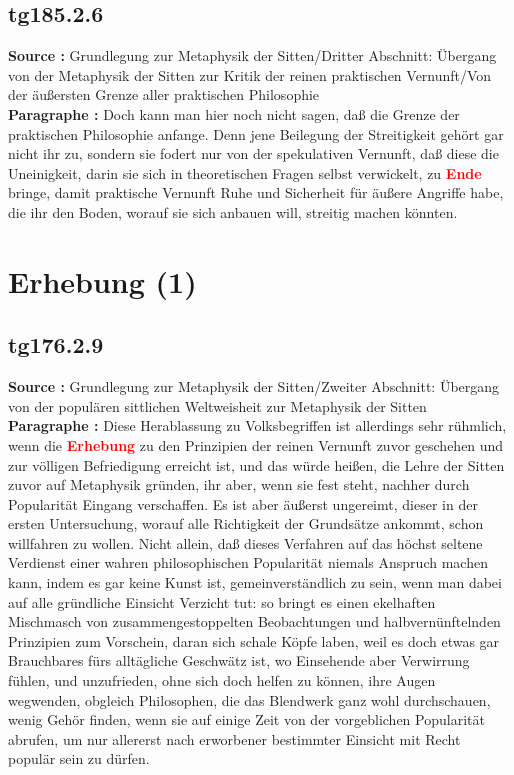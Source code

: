 \documentclass[a4paper,12pt,twoside]{book}
\newcommand{\match}[1]{\textcolor{red}{\textbf{#1}}}
\newcommand{\unnumberedsection}[1]{
	\section*{#1}
	\addcontentsline{toc}{section}{#1}
	\markright{#1}
}
\begin{document}
	\subsection*{tg185.2.6} 
	\textbf{Source : }Grundlegung zur Metaphysik der Sitten/Dritter Abschnitt: Übergang von der Metaphysik der Sitten zur Kritik der reinen praktischen Vernunft/Von der äußersten Grenze aller praktischen Philosophie\\  
	
	\noindent\textbf{Paragraphe : }Doch kann man hier noch nicht sagen, daß die Grenze der praktischen Philosophie anfange. Denn jene Beilegung der Streitigkeit gehört gar nicht ihr zu, sondern sie fodert nur von der spekulativen Vernunft, daß diese die Uneinigkeit, darin sie sich in theoretischen Fragen selbst verwickelt, zu \match{Ende} bringe, damit praktische Vernunft Ruhe und Sicherheit für äußere Angriffe habe, die ihr den Boden, worauf sie sich anbauen will, streitig machen könnten. 
	
	\unnumberedsection{Erhebung (1)} 
	\subsection*{tg176.2.9} 
	\textbf{Source : }Grundlegung zur Metaphysik der Sitten/Zweiter Abschnitt: Übergang von der populären sittlichen Weltweisheit zur Metaphysik der Sitten\\  
	
	\noindent\textbf{Paragraphe : }Diese Herablassung zu Volksbegriffen ist allerdings sehr rühmlich, wenn die \match{Erhebung} zu den Prinzipien der reinen Vernunft zuvor geschehen und zur völligen Befriedigung erreicht ist, und das würde heißen, die Lehre der Sitten zuvor auf Metaphysik gründen, ihr aber, wenn sie fest steht, nachher durch Popularität Eingang verschaffen. Es ist aber äußerst ungereimt, dieser in der ersten Untersuchung, worauf alle Richtigkeit der Grundsätze ankommt, schon willfahren zu wollen. Nicht allein, daß dieses Verfahren auf das höchst seltene Verdienst einer wahren philosophischen Popularität niemals Anspruch machen kann, indem es gar keine Kunst ist, gemeinverständlich zu sein, wenn man dabei auf alle gründliche Einsicht Verzicht tut: so bringt es einen ekelhaften Mischmasch von zusammengestoppelten Beobachtungen und halbvernünftelnden Prinzipien zum Vorschein, daran sich schale Köpfe laben, weil es doch etwas gar Brauchbares fürs alltägliche Geschwätz ist, wo Einsehende aber Verwirrung fühlen, und unzufrieden, ohne sich doch helfen zu können, ihre Augen wegwenden, obgleich Philosophen, die das Blendwerk ganz wohl durchschauen, wenig  Gehör finden, wenn sie auf einige Zeit von der vorgeblichen Popularität abrufen, um nur allererst nach erworbener bestimmter Einsicht mit Recht populär sein zu dürfen. 
	
\end{document}
